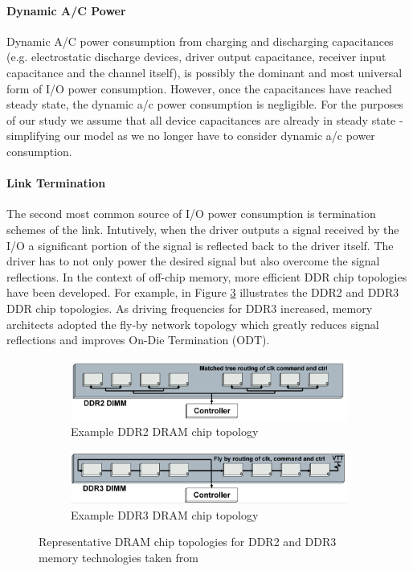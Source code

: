 \paragraph{Dynamic A/C Power} Dynamic A/C power consumption from charging and
discharging capacitances (e.g. electrostatic discharge devices, driver output
capacitance, receiver input capacitance and the channel itself), is possibly
the dominant and most universal form of I/O power consumption. However, once
the capacitances have reached steady state, the dynamic a/c power consumption
is negligible. For the purposes of our study we assume that all device
capacitances are already in steady state - simplifying our model as we no
longer have to consider dynamic a/c power consumption.

\paragraph{Link Termination} The second most common source of I/O power
consumption is termination schemes of the link. Intutively, when the driver
outputs a signal received by the I/O a significant portion of the signal is
reflected back to the driver itself. The driver has to not only power the
desired signal but also overcome the signal reflections. In the context of
off-chip memory, more efficient DDR chip topologies have been developed. For
example, in Figure \ref{dram-chips} illustrates the DDR2 and DDR3 DDR chip
topologies. As driving frequencies for DDR3 increased, memory architects
adopted the fly-by network topology which greatly reduces signal reflections
and improves On-Die Termination (ODT).

\begin{figure}[!htb]
  \centering
  \begin{subfigure}[b]{0.4\textwidth}
    \includegraphics[width=\textwidth]{figs/ddr2-topology}
    \caption{Example DDR2 DRAM chip topology}
    \label{fig:ddr2-chips}
  \end{subfigure}

  \begin{subfigure}[b]{0.4\textwidth}
    \includegraphics[width=\textwidth]{figs/ddr3-topology}
    \caption{Example DDR3 DRAM chip topology}
    \label{fig:ddr3-chips}
  \end{subfigure}
  \caption{Representative DRAM chip topologies for DDR2 and DDR3 memory technologies taken from \cite{ddr-design}}
  \label{dram-chips}
\end{figure}

